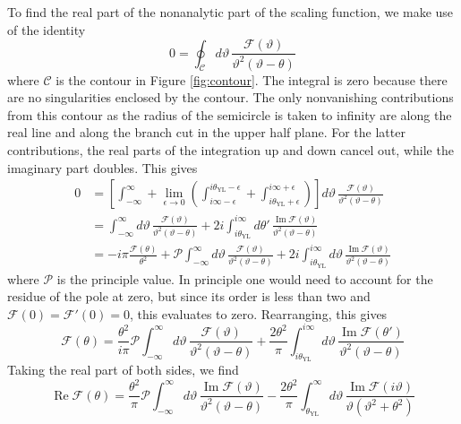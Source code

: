 \documentclass[
aps,
pre,
preprint,
longbibliography,
floatfix
]{revtex4-2}
\begin{document}
To find the real part of the nonanalytic part of the scaling function, we make
use of the identity
\begin{equation}
  0=\oint_{\mathcal C}d\vartheta\,\frac{\mathcal F(\vartheta)}{\vartheta^2(\vartheta-\theta)}
\end{equation}
where $\mathcal C$ is the contour in Figure \ref{fig:contour}. The integral is
zero because there are no singularities enclosed by the contour. The only
nonvanishing contributions from this contour as the radius of the semicircle is
taken to infinity are along the real line and along the branch cut in the upper
half plane. For the latter contributions, the real parts of the integration up
and down cancel out, while the imaginary part doubles. This gives
\begin{equation}
  \begin{aligned}
    0&=\left[\int_{-\infty}^\infty+\lim_{\epsilon\to0}\left(\int_{i\infty-\epsilon}^{i\theta_{\mathrm{YL}}-\epsilon}+\int^{i\infty+\epsilon}_{i\theta_{\mathrm{YL}}+\epsilon}\right)\right]
      d\vartheta\,\frac{\mathcal F(\vartheta)}{\vartheta^2(\vartheta-\theta)} \\
     &=\int_{-\infty}^\infty d\vartheta\,\frac{\mathcal F(\vartheta)}{\vartheta^2(\vartheta-\theta)}
     +2i\int_{i\theta_{\mathrm{YL}}}^{i\infty}d\theta'\,\frac{\operatorname{Im}\mathcal F(\vartheta)}{\vartheta^2(\vartheta-\theta)} \\
     &=-i\pi\frac{\mathcal F(\theta)}{\theta^2}+\mathcal P\int_{-\infty}^\infty d\vartheta\,\frac{\mathcal F(\vartheta)}{\vartheta^2(\vartheta-\theta)}
     +2i\int_{i\theta_{\mathrm{YL}}}^{i\infty}d\vartheta\,\frac{\operatorname{Im}\mathcal F(\vartheta)}{\vartheta^2(\vartheta-\theta)}
  \end{aligned}
\end{equation}
where $\mathcal P$ is the principle value.  In principle one would need to
account for the residue of the pole at zero, but since its order is less than
two and $\mathcal F(0)=\mathcal F'(0)=0$, this evaluates to zero. Rearranging, this gives
\begin{equation}
  \mathcal F(\theta)
  =\frac{\theta^2}{i\pi}\mathcal P\int_{-\infty}^\infty d\vartheta\,\frac{\mathcal F(\vartheta)}{\vartheta^2(\vartheta-\theta)}
  +\frac{2\theta^2}\pi\int_{i\theta_{\mathrm{YL}}}^{i\infty}d\vartheta\,\frac{\operatorname{Im}\mathcal F(\theta')}{\vartheta^2(\vartheta-\theta)}
\end{equation}
Taking the real part of both sides, we find
\begin{equation}
  \operatorname{Re}\mathcal F(\theta)
  =\frac{\theta^2}{\pi}\mathcal P\int_{-\infty}^\infty d\vartheta\,\frac{\operatorname{Im}\mathcal F(\vartheta)}{\vartheta^2(\vartheta-\theta)}
  -\frac{2\theta^2}\pi\int_{\theta_{\mathrm{YL}}}^{\infty}d\vartheta\,\frac{\operatorname{Im}\mathcal F(i\vartheta)}{\vartheta(\vartheta^2+\theta^2)}
\end{equation}
\end{document}
